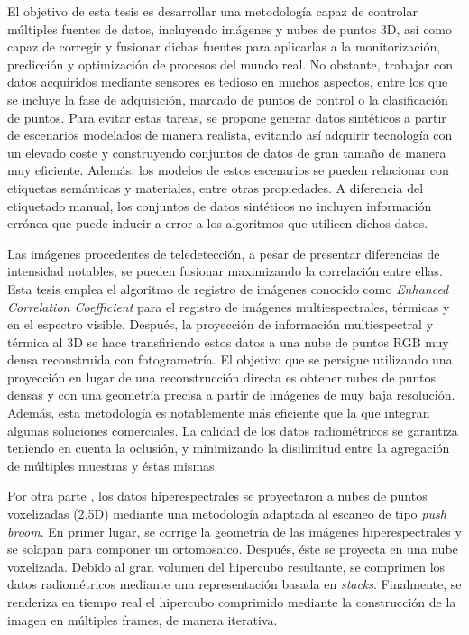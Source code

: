 \newpage
{}

\normalsize
\libertineNormal

El objetivo de esta tesis es desarrollar una metodología capaz de controlar múltiples fuentes de datos, incluyendo imágenes y nubes de puntos 3D, así como capaz de corregir y fusionar dichas fuentes para aplicarlas a la monitorización, predicción y optimización de procesos del mundo real. No obstante, trabajar con datos acquiridos mediante sensores es tedioso en muchos aspectos, entre los que se incluye la fase de adquisición, marcado de puntos de control o la clasificación de puntos. Para evitar estas tareas, se propone generar datos sintéticos a partir de escenarios modelados de manera realista, evitando así adquirir tecnología con un elevado coste y construyendo conjuntos de datos de gran tamaño de manera muy eficiente. Además, los modelos de estos escenarios se pueden relacionar con etiquetas semánticas y materiales, entre otras propiedades. A diferencia del etiquetado manual, los conjuntos de datos sintéticos no incluyen información errónea que puede inducir a error a los algoritmos que utilicen dichos datos.

Las imágenes procedentes de teledetección, a pesar de presentar diferencias de intensidad notables, se pueden fusionar maximizando la correlación entre ellas. Esta tesis emplea el algoritmo de registro de imágenes conocido como \textit{Enhanced Correlation Coefficient} para el registro de imágenes multiespectrales, térmicas y en el espectro visible. Después, la proyección de información multiespectral y térmica al 3D se hace transfiriendo estos datos a una nube de puntos RGB muy densa reconstruida con fotogrametría. El objetivo que se persigue utilizando una proyección en lugar de una reconstrucción directa es obtener nubes de puntos densas y con una geometría precisa a partir de imágenes de muy baja resolución. Además, esta metodología es notablemente más eficiente que la que integran algunas soluciones comerciales. La calidad de los datos radiométricos se garantiza teniendo en cuenta la oclusión, y minimizando la disilimitud entre la agregación de múltiples muestras y éstas mismas.

Por otra parte , los datos hiperespectrales se proyectaron a nubes de puntos voxelizadas (2.5D) mediante una metodología adaptada al escaneo de tipo \textit{push broom}. En primer lugar, se corrige la geometría de las imágenes hiperespectrales y se solapan para componer un ortomosaico. Después, éste se proyecta en una nube voxelizada. Debido al gran volumen del hipercubo resultante, se comprimen los datos radiométricos mediante una representación basada en \textit{stacks}. Finalmente, se renderiza en tiempo real el hipercubo comprimido mediante la construcción de la imagen en múltiples frames, de manera iterativa.
 
